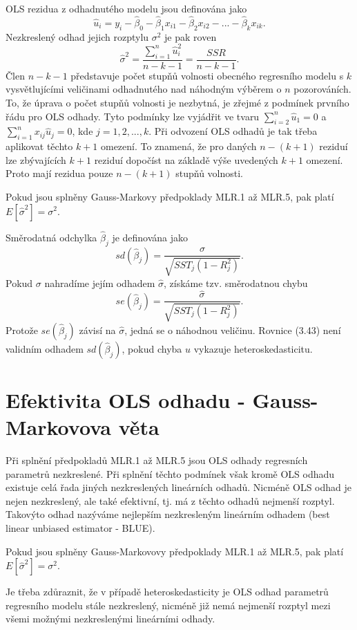 OLS rezidua z odhadnutého modelu jsou definována jako
\begin{equation}
\hat{u}_i = y_i - \hat{\beta}_0 - \hat{\beta}_1 x_{i1} - \hat{\beta}_2 x_{i2} - ... - \hat{\beta}_k x_{ik}.
\end{equation}
Nezkreslený odhad jejich rozptylu $\sigma^2$ je pak roven
\begin{equation}
\hat{\sigma}^2 = \frac{\sum_{i = 1}^n \hat{u}_i^2}{n - k - 1} = \frac{SSR}{n - k - 1}.
\end{equation}
Člen $n - k - 1$ představuje počet stupňů volnosti obecného regresního modelu s $k$ vysvětlujícími veličinami odhadnutého nad náhodným 
výběrem o $n$ pozorováních. To, že úprava o počet stupňů volnosti je nezbytná, je zřejmé z podmínek prvního řádu 
pro OLS odhady. Tyto podmínky lze vyjádřit ve tvaru $\sum_{i = 2}^n \hat{u}_1 = 0$ a $\sum_{i = 1}^n x_{ij}\hat{u}_j = 0$, kde $j = 1, 2, ..., k$. Při 
odvození OLS odhadů je tak třeba aplikovat těchto $k+1$ omezení. To znamená, že pro daných $n - (k + 1)$ reziduí lze zbývajících $k + 1$ 
reziduí dopočíst na základě výše uvedených $k + 1$ omezení. Proto mají rezidua pouze $n - (k + 1)$ stupňů volnosti.
\begin{theorem}
Pokud jsou splněny Gauss-Markovy předpoklady MLR.1 až MLR.5, pak platí $E[\hat{\sigma}^2] = \sigma^2$.

\raggedleft{$\clubsuit$}
\end{theorem}
Směrodatná odchylka $\hat{\beta}_j$ je definována jako
\begin{equation}
sd(\hat{\beta}_j) = \frac{\sigma}{\sqrt{SST_j(1 - R^2_j)}}.
\end{equation}
Pokud $\sigma$ nahradíme jejím odhadem $\hat{\sigma}$, získáme tzv. směrodatnou chybu
\begin{equation}
se(\hat{\beta}_j) = \frac{\hat{\sigma}}{\sqrt{SST_j(1 - R^2_j)}}.
\end{equation}
Protože $se(\hat{\beta}_j)$ závisí na $\hat{\sigma}$, jedná se o náhodnou veličinu. Rovnice (3.43) není validním odhadem $sd(\hat{\beta}_j)$, 
pokud chyba $u$ vykazuje heteroskedasticitu.

\section{Efektivita OLS odhadu - Gauss-Markovova věta}

Při splnění předpokladů MLR.1 až MLR.5 jsou OLS odhady regresních parametrů nezkreslené. Při splnění těchto podmínek však kromě OLS odhadu existuje celá 
řada jiných nezkreslených lineárních odhadů. Nicméně OLS odhad je nejen nezkreslený, ale také efektivní, tj. má z těchto odhadů 
nejmenší rozptyl. Takovýto odhad nazýváme nejlepším nezkresleným lineárním odhadem (best linear unbiased estimator - BLUE).
\begin{theorem}
Pokud jsou splněny Gauss-Markovovy předpoklady MLR.1 až MLR.5, pak platí $E[\hat{\sigma}^2] = \sigma^2$.

\raggedleft{$\clubsuit$}
\end{theorem}

Je třeba zdůraznit, že v případě heteroskedasticity je OLS 
odhad parametrů regresního modelu stále nezkreslený, nicméně již nemá nejmenší rozptyl mezi všemi možnými nezkreslenými lineárními odhady.
